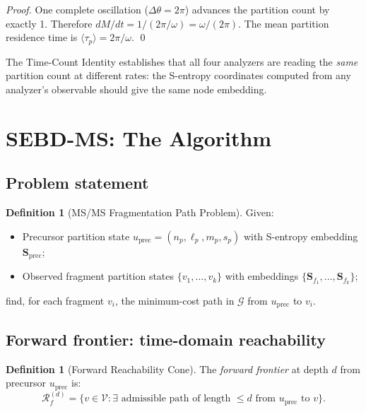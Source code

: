 \documentclass[twocolumn,10pt,a4paper]{article}
\theoremstyle{thmstyle}
\theoremstyle{definition}
\newtheorem{definition}[theorem]{Definition}
\theoremstyle{remark}
\newcommand{\Sv}{\mathbf{S}}
\newcommand{\tp}{\langle\tau_{p}\rangle}
\newcommand{\calG}{\mathcal{G}}
\newcommand{\calV}{\mathcal{V}}
\newcommand{\Mcyc}{M}
\newcommand{\Reachf}{\mathcal{R}_f}
\begin{document}
\begin{proof}
One complete oscillation ($\Delta\theta = 2\pi$) advances the partition
count by exactly 1. Therefore $d\Mcyc/dt = 1/(2\pi/\omega) =
\omega/(2\pi)$. The mean partition residence time is $\tp = 2\pi/\omega$.
\qed
\end{proof}

The Time-Count Identity establishes that all four analyzers are reading
the \emph{same} partition count at different rates: the S-entropy
coordinates computed from any analyzer's observable should give the
same node embedding.

\section{SEBD-MS: The Algorithm}
\label{sec:algorithm}

\subsection{Problem statement}

\begin{definition}[MS/MS Fragmentation Path Problem]
\label{def:problem}
Given:
\begin{itemize}[nosep]
\item Precursor partition state $u_\text{prec} = (n_p, \ell_p, m_p, s_p)$
  with S-entropy embedding $\Sv_\text{prec}$;
\item Observed fragment partition states $\{v_1, \ldots, v_k\}$ with
  embeddings $\{\Sv_{f_1}, \ldots, \Sv_{f_k}\}$;
\end{itemize}
find, for each fragment $v_i$, the minimum-cost path in $\calG$ from
$u_\text{prec}$ to $v_i$.
\end{definition}

\subsection{Forward frontier: time-domain reachability}

\begin{definition}[Forward Reachability Cone]
\label{def:forward}
The \emph{forward frontier} at depth $d$ from precursor $u_\text{prec}$
is:
\begin{equation}
\Reachf^{(d)} = \bigl\{v \in \calV :
\exists \text{ admissible path of length } \leq d
\text{ from } u_\text{prec} \text{ to } v\bigr\}.
\end{equation}
\end{definition}
\end{document}
